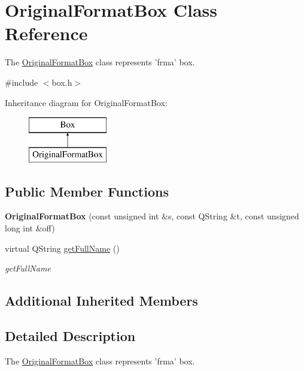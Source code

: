 \hypertarget{class_original_format_box}{\section{Original\-Format\-Box Class Reference}
\label{class_original_format_box}
}


The \hyperlink{class_original_format_box}{Original\-Format\-Box} class represents 'frma' box.  




{\ttfamily \#include $<$box.\-h$>$}

Inheritance diagram for Original\-Format\-Box\-:\begin{figure}[H]
\begin{center}
\leavevmode
\includegraphics[height=2.000000cm]{class_original_format_box}
\end{center}
\end{figure}
\subsection*{Public Member Functions}
\begin{DoxyCompactItemize}
\item 
\hypertarget{class_original_format_box_ac15a1f099a09811118ac54c88bcd09cd}{{\bfseries Original\-Format\-Box} (const unsigned int \&s, const Q\-String \&t, const unsigned long int \&off)}\label{class_original_format_box_ac15a1f099a09811118ac54c88bcd09cd}

\item 
virtual Q\-String \hyperlink{class_original_format_box_af113c3ee7fa52db04b3bb3c58aa09724}{get\-Full\-Name} ()
\begin{DoxyCompactList}\small\item\em get\-Full\-Name \end{DoxyCompactList}\end{DoxyCompactItemize}
\subsection*{Additional Inherited Members}


\subsection{Detailed Description}
The \hyperlink{class_original_format_box}{Original\-Format\-Box} class represents 'frma' box. 

